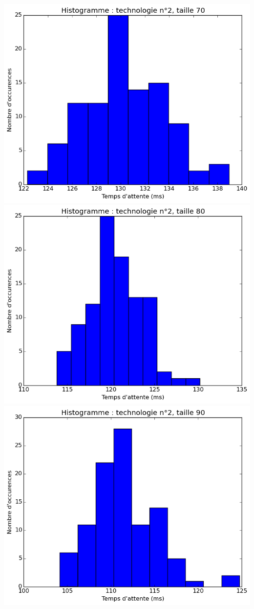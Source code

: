 \documentclass[a4paper,10pt]{article}
\begin{document}
\\
\includegraphics[scale=0.4]{img/2-70.png}
\includegraphics[scale=0.4]{img/2-80.png}
\\
\includegraphics[scale=0.4]{img/2-90.png}
\end{document}
